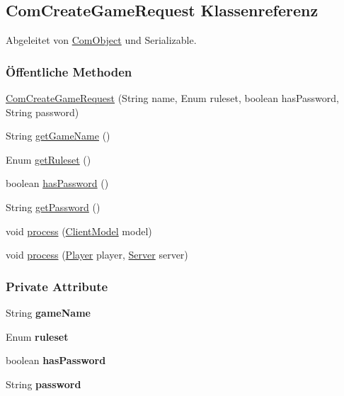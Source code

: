 \hypertarget{a00029}{\subsection{Com\-Create\-Game\-Request Klassenreferenz}
\label{a00029}
}


Abgeleitet von \hyperlink{a00037}{Com\-Object} und Serializable.

\subsubsection*{Öffentliche Methoden}
\begin{DoxyCompactItemize}
\item 
\hyperlink{a00029_ae9a04ab3344ed723dd4806b20b6e6773}{Com\-Create\-Game\-Request} (String name, Enum ruleset, boolean has\-Password, String password)
\item 
String \hyperlink{a00029_ad95c81dd65ee13b7b9618f184cffb6e0}{get\-Game\-Name} ()
\item 
Enum \hyperlink{a00029_a0f314bfed7ed858eb5191afcdab16164}{get\-Ruleset} ()
\item 
boolean \hyperlink{a00029_a800382a70eb2844e6fd5aec28f26823e}{has\-Password} ()
\item 
String \hyperlink{a00029_a26b3c6f2d61d7d4bbe91a7deb815e86d}{get\-Password} ()
\item 
void \hyperlink{a00029_a758d7005755a181717f238f714d87dd2}{process} (\hyperlink{a00003}{Client\-Model} model)
\item 
void \hyperlink{a00029_ac67b5ce3ec03d48ef1e6caad6e49c902}{process} (\hyperlink{a00076}{Player} player, \hyperlink{a00077}{Server} server)
\end{DoxyCompactItemize}
\subsubsection*{Private Attribute}
\begin{DoxyCompactItemize}
\item 
\hypertarget{a00029_afb890aade38077b7965b541675500834}{String {\bfseries game\-Name}}\label{a00029_afb890aade38077b7965b541675500834}

\item 
\hypertarget{a00029_a04549609a9179f167b6be6870322cdc1}{Enum {\bfseries ruleset}}\label{a00029_a04549609a9179f167b6be6870322cdc1}

\item 
\hypertarget{a00029_aeb207819150d367d4c5b73beaec78e52}{boolean {\bfseries has\-Password}}\label{a00029_aeb207819150d367d4c5b73beaec78e52}

\item 
\hypertarget{a00029_acbd76b816d055b7a642c219fd9751020}{String {\bfseries password}}\label{a00029_acbd76b816d055b7a642c219fd9751020}

\end{DoxyCompactItemize}


